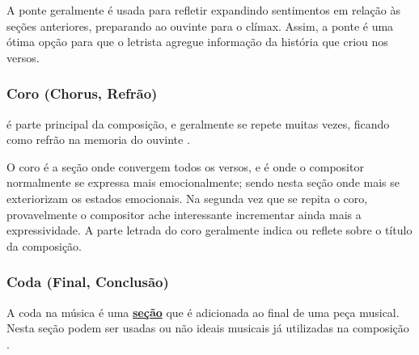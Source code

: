 A ponte geralmente é usada para refletir expandindo sentimentos em relação às seções anteriores,
preparando ao ouvinte para o clímax.
Assim, a ponte é uma ótima opção para que o letrista agregue informação da história que criou nos versos.

\subsubsection{Coro (Chorus, Refrão)}
\label{ref:Coro}

é parte principal da composição, 
e geralmente  se repete muitas vezes, 
ficando como refrão na memoria do ouvinte
\cite[pp. 18]{adolfo1997composicao}.

O coro é a seção onde convergem todos os versos, 
e é onde o compositor normalmente se expressa mais emocionalmente;
sendo nesta seção onde mais se exteriorizam os estados emocionais. 
Na segunda vez que se repita o coro, 
provavelmente o compositor ache interessante incrementar ainda mais a expressividade.
A parte letrada do coro geralmente indica ou reflete sobre o título da composição.

\subsubsection{Coda (Final, Conclusão)}
\label{ref:Coda}
A coda na música é uma \hyperref[ref:Secao]{\textbf{seção}}  que é adicionada ao final de uma peça musical. 
Nesta seção podem ser usadas ou não ideais musicais já utilizadas na composição
\cite[pp. 17]{adolfo1997composicao}.






